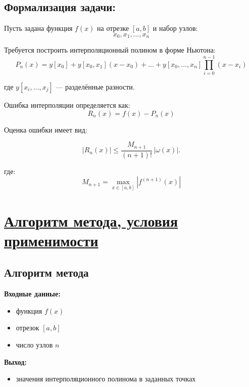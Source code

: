 \documentclass[14pt]{extarticle}
\begin{document}
	\subsection{Формализация задачи:}
	Пусть задана функция $f(x)$ на отрезке $[a,b]$ и набор узлов:
	\[
	x_0, x_1, \dots, x_n
	\]
	
	Требуется построить интерполяционный полином в форме Ньютона:
	\begin{equation}
		P_n(x) = y[x_0] + y[x_0,x_1](x - x_0) + \dots + y[x_0,\dots,x_n]\prod_{i=0}^{n-1}(x - x_i)\label{eq:1}
	\end{equation}
	
	где $y[x_i,\dots,x_j]$ — разделённые разности.
	
	Ошибка интерполяции определяется как:
	\begin{equation}
		R_n(x) = f(x) - P_n(x)\label{eq:2}
	\end{equation}
	
	Оценка ошибки имеет вид:
	
	\begin{equation}
		|R_n(x)| \le \frac{M_{n+1}}{(n+1)!}\,|\omega(x)|.\label{eq:3}
	\end{equation}
	
	где:
	\begin{equation}
		M_{n+1} = \max_{x \in [a,b]} |f^{(n+1)}(x)|\label{eq:4}
	\end{equation}
	
	
	\newpage
	\section{\Large \underline{Алгоритм метода, условия применимости}}
	
	\subsection{Алгоритм метода}
	
	\textbf{Входные данные:}
	\begin{itemize}
		\item функция $f(x)$
		\item отрезок $[a,b]$
		\item число узлов $n$
	\end{itemize}
	
	\textbf{Выход:}
	\begin{itemize}
		\item значения интерполяционного полинома в заданных точках
	\end{itemize}
	
\end{document}

